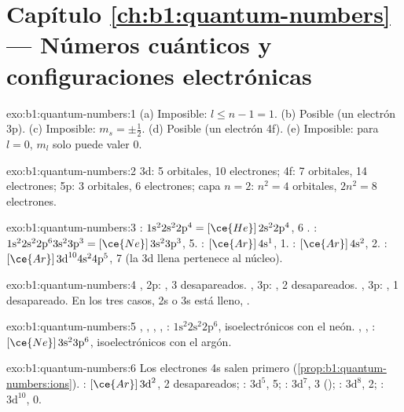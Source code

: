 \section*{Capítulo \ref{ch:b1:quantum-numbers} --- Números cuánticos y configuraciones electrónicas}

\begin{solution}{exo:b1:quantum-numbers:1}
(a) Imposible: $l \le n - 1 = 1$. (b) Posible (un electrón 3p).
(c) Imposible: $m_s = \pm\tfrac12$. (d) Posible (un electrón 4f).
(e) Imposible: para $l = 0$, $m_l$ solo puede valer 0.
\end{solution}

\begin{solution}{exo:b1:quantum-numbers:2}
3d: 5 orbitales, 10 electrones; 4f: 7 orbitales, 14 electrones; 5p: 3
orbitales, 6 electrones; capa $n = 2$: $n^2 = 4$ orbitales, $2n^2 = 8$
electrones.
\end{solution}

\begin{solution}{exo:b1:quantum-numbers:3}
: $1\text{s}^2 2\text{s}^2 2\text{p}^4 = [\ce{He}]\,2\text{s}^2 2\text{p}^4$,
6 . : $1\text{s}^2 2\text{s}^2 2\text{p}^6 3\text{s}^2
3\text{p}^3 = [\ce{Ne}]\,3\text{s}^2 3\text{p}^3$, 5. : $[\ce{Ar}]\,4\text{s}^1$,
1. : $[\ce{Ar}]\,4\text{s}^2$, 2. : $[\ce{Ar}]\,3\text{d}^{10}
4\text{s}^2 4\text{p}^5$, 7 (la  3d llena pertenece al núcleo).
\end{solution}

\begin{solution}{exo:b1:quantum-numbers:4}
, 2p: , 3 desapareados. , 3p: ,
2 desapareados. , 3p: , 1 desapareado. En los tres
casos, 2s o 3s está lleno, .
\end{solution}

\begin{solution}{exo:b1:quantum-numbers:5}
, , , , : $1\text{s}^2
2\text{s}^2 2\text{p}^6$, isoelectrónicos con el neón. , ,
: $[\ce{Ne}]\,3\text{s}^2 3\text{p}^6$, isoelectrónicos con el
argón.
\end{solution}

\begin{solution}{exo:b1:quantum-numbers:6}
Los electrones 4s salen primero (\cref{prop:b1:quantum-numbers:ions}).
: $[\ce{Ar}]\,3\text{d}^2$, 2 desapareados; :
$3\text{d}^5$, 5; : $3\text{d}^7$, 3 ();
: $3\text{d}^8$, 2; : $3\text{d}^{10}$, 0.
\end{solution}

